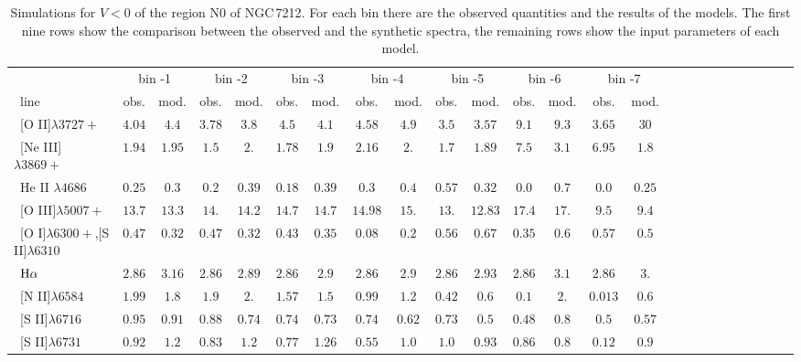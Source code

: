 \documentclass[../thesis.tex]{subfiles}
\begin{document}
\begin{landscape}
\begin{table}

\centering
\caption{Simulations for $V<0$ of the region N0 of NGC\,7212. For each bin there are the observed quantities and the results of the models. The first nine rows show the comparison between the observed and the synthetic spectra, the remaining rows show the input parameters of each model.}
\label{tab:sim_N0-N}


\small{
\begin{tabular}{lcccccccccccccccccccccccc}
\hline
\ &\multicolumn{2}{c}{bin -1}&\multicolumn{2}{c}{bin -2}&\multicolumn{2}{c}{bin -3}&\multicolumn{2}{c}{bin -4}&\multicolumn{2}{c}{bin -5}&\multicolumn{2}{c}{bin -6}&\multicolumn{2}{c}{bin -7}\\
\   line              & obs.  &mod. &obs.&mod.&obs.  &mod.&obs. &mod. &obs.&mod. &obs.&mod.&obs.&mod.\\ \hline
\ [O II]$\lambda3727+$          &$4.04  $&$4.4   $&$3.78   $&$ 3.8  $&$4.5  $&$4.1   $&$4.58  $&$4.9  $&$3.5   $&$3.57  $&$9.1 $&$9.3 $&$3.65$&$30$\\
\  [Ne III]$\lambda3869+$        &$1.94  $&$1.95  $&$1.5    $&$ 2.   $&$1.78 $&$1.9   $&$2.16  $&$2.    $&$1.7   $&$1.89 $&$7.5 $&$3.1$&$6.95$&$1.8$\\
\  He II $\lambda4686$           &$0.25  $&$0.3   $&$0.2    $&$ 0.39 $&$0.18 $&$0.39  $&$0.3   $&$0.4   $&$0.57  $&$0.32  $&$0.0 $&$0.7$&$0.0 $&$0.25 $ \\
\  [O III]$\lambda5007+$         &$13.7  $&$13.3  $&$ 14.   $&$ 14.2 $&$14.7 $&$14.7  $&$14.98 $&$15.   $&$13.   $&$ 12.83$&$17.4$&$17.$&$9.5 $&$9.4$\\
\  [O I]$\lambda6300+$,[S II]$\lambda6310$&$0.47  $&$0.32  $&$0.47   $&$0.32  $&$0.43 $&$0.35  $&$0.08  $&$0.2   $&$0.56  $&$0.67  $&$0.35$&$0.6$&$0.57$&$0.5$\\
\ $\rm H\alpha$                 &$2.86  $&$3.16  $&$2.86   $&$ 2.89 $&$2.86 $&$2.9   $&$2.86  $&$2.9   $&$2.86  $&$2.93  $&$2.86$&$3.1$&$2.86$&$3.$\\
\  [N II]$\lambda6584$           &$1.99  $&$1.8   $&$1.9    $&$ 2.   $&$1.57 $&$1.5   $&$0.99  $&$1.2   $&$0.42  $&$0.6   $&$0.1 $&$2.$&$0.013$&$0.6$\\
\  [S II]$\lambda6716$           &$0.95  $&$0.91  $&$0.88   $&$ 0.74 $&$0.74 $&$0.73  $&$0.74  $&$0.62  $&$0.73  $&$0.5   $&$0.48$&$0.8$&$0.5 $&$0.57$\\
\  [S II]$\lambda6731$           &$0.92  $&$1.2   $&$0.83   $&$ 1.2  $&$0.77 $&$1.26  $&$0.55  $&$1.0   $&$1.0   $&$0.93  $&$0.86$&$0.8 $&$0.12$&$0.9$\\

\end{tabular}}
\end{table}
\end{landscape}
\end{document}
